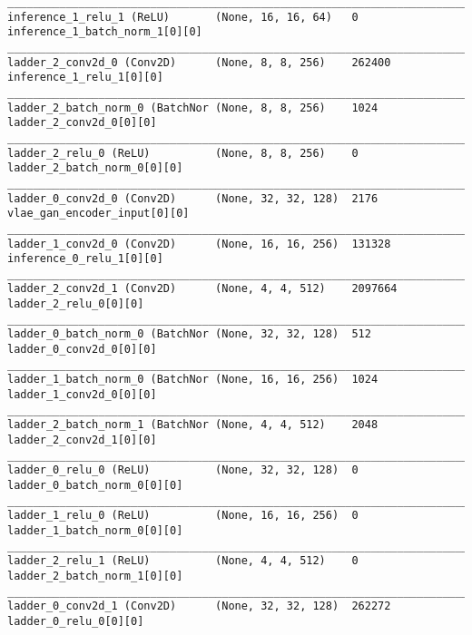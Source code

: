 \begin{lstlisting}[caption={dSprites-VLAE-GAN Encoder},captionpos=b,basicstyle=\tiny, label={lst:mnist-vlae-gan-encoder}]
__________________________________________________________________________________________________
inference_1_relu_1 (ReLU)       (None, 16, 16, 64)   0           inference_1_batch_norm_1[0][0]
__________________________________________________________________________________________________
ladder_2_conv2d_0 (Conv2D)      (None, 8, 8, 256)    262400      inference_1_relu_1[0][0]
__________________________________________________________________________________________________
ladder_2_batch_norm_0 (BatchNor (None, 8, 8, 256)    1024        ladder_2_conv2d_0[0][0]
__________________________________________________________________________________________________
ladder_2_relu_0 (ReLU)          (None, 8, 8, 256)    0           ladder_2_batch_norm_0[0][0]
__________________________________________________________________________________________________
ladder_0_conv2d_0 (Conv2D)      (None, 32, 32, 128)  2176        vlae_gan_encoder_input[0][0]
__________________________________________________________________________________________________
ladder_1_conv2d_0 (Conv2D)      (None, 16, 16, 256)  131328      inference_0_relu_1[0][0]
__________________________________________________________________________________________________
ladder_2_conv2d_1 (Conv2D)      (None, 4, 4, 512)    2097664     ladder_2_relu_0[0][0]
__________________________________________________________________________________________________
ladder_0_batch_norm_0 (BatchNor (None, 32, 32, 128)  512         ladder_0_conv2d_0[0][0]
__________________________________________________________________________________________________
ladder_1_batch_norm_0 (BatchNor (None, 16, 16, 256)  1024        ladder_1_conv2d_0[0][0]
__________________________________________________________________________________________________
ladder_2_batch_norm_1 (BatchNor (None, 4, 4, 512)    2048        ladder_2_conv2d_1[0][0]
__________________________________________________________________________________________________
ladder_0_relu_0 (ReLU)          (None, 32, 32, 128)  0           ladder_0_batch_norm_0[0][0]
__________________________________________________________________________________________________
ladder_1_relu_0 (ReLU)          (None, 16, 16, 256)  0           ladder_1_batch_norm_0[0][0]
__________________________________________________________________________________________________
ladder_2_relu_1 (ReLU)          (None, 4, 4, 512)    0           ladder_2_batch_norm_1[0][0]
__________________________________________________________________________________________________
ladder_0_conv2d_1 (Conv2D)      (None, 32, 32, 128)  262272      ladder_0_relu_0[0][0]

\end{lstlisting}
